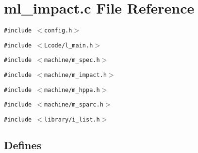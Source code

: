 \section{ml\_\-impact.c File Reference}
\label{ml__impact_8c}
{\tt \#include $<$config.h$>$}\par
{\tt \#include $<$Lcode/l\_\-main.h$>$}\par
{\tt \#include $<$machine/m\_\-spec.h$>$}\par
{\tt \#include $<$machine/m\_\-impact.h$>$}\par
{\tt \#include $<$machine/m\_\-hppa.h$>$}\par
{\tt \#include $<$machine/m\_\-sparc.h$>$}\par
{\tt \#include $<$library/i\_\-list.h$>$}\par
\subsection*{Defines}
